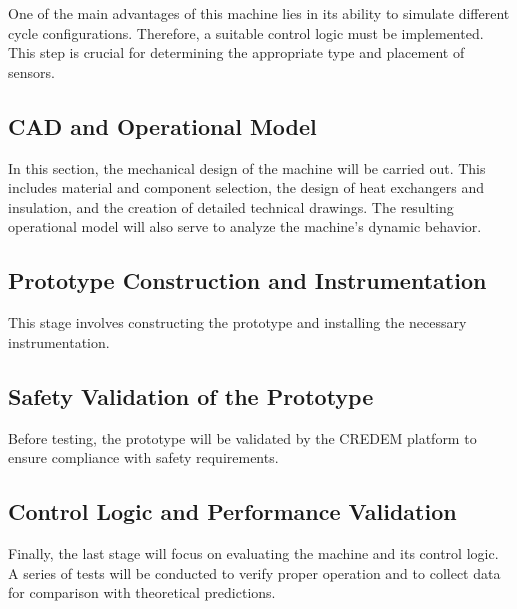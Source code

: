 One of the main advantages of this machine lies in its ability to simulate different cycle configurations. 
Therefore, a suitable control logic must be implemented. This step is crucial 
for determining the appropriate type and placement of sensors.

\subsection*{CAD and Operational Model}

In this section, the mechanical design of the machine will be carried out. 
This includes material and component selection, the design of heat exchangers and insulation, and 
the creation of detailed technical drawings. The resulting operational model 
will also serve to analyze the machine's dynamic behavior.

\subsection*{Prototype Construction and Instrumentation}

This stage involves constructing the prototype and installing the necessary instrumentation.

\subsection*{Safety Validation of the Prototype}

Before testing, the prototype will be 
validated by the CREDEM platform to ensure compliance with safety requirements.

\subsection*{Control Logic and Performance Validation}

Finally, the last stage will focus on evaluating the machine and its control logic. 
A series of tests will be conducted to verify proper operation and to collect data for 
comparison with theoretical predictions.
